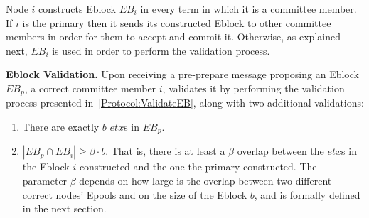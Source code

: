 Node $i$ constructs Eblock $EB_i$ in every term in which it is a committee member. If $i$ is the primary then it sends its constructed Eblock to other committee members in order for them to accept and commit it. Otherwise, as explained next, $EB_i$ is used in order to perform the validation process. 

\textbf{Eblock Validation.} Upon receiving a pre-prepare message proposing an Eblock $EB_p$, a correct committee member $i$, validates it by performing the validation process presented in~\ref{Protocol:ValidateEB}, along with two additional validations: 
\begin{enumerate}
\item There are exactly $b$ $etx$s in $EB_p$.
\item $ |EB_p\cap EB_i|\geq \beta \cdot b$. That is, there is at least a $\beta$ overlap between the $etx$s in the Eblock $i$ constructed and the one the primary constructed. The parameter $\beta$ depends on how large is the overlap between two different correct nodes' Epools and on the size of the Eblock $b$, and is formally defined in the next section.
\end{enumerate}





